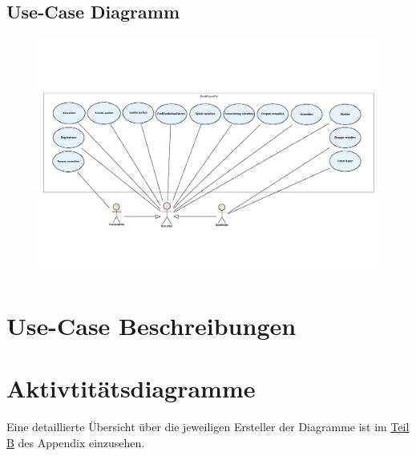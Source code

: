\documentclass[DIV=13, 10pt,a4paper]{scrartcl}
\begin{document}
\newpage
\begin{landscape}
	\thispagestyle{empty}
	\section{Use-Case Diagramm}
	\begin{figure}[h!]
		\centering
		\includegraphics[width=\textheight]{docs/1_UseCaseDiagramme/PrimaryUseCases.pdf}
		\label{fig:UCD}
	\end{figure}
	\restoregeometry
\end{landscape}

\newpage
\section{Use-Case Beschreibungen}





\pagebreak

\section{Aktivtitätsdiagramme}




\vfill
Eine detaillierte Übersicht über die jeweiligen Ersteller der Diagramme ist im \hyperref[app:B_DiagrammUebersicht]{Teil B} des Appendix einzusehen.
\end{document}
